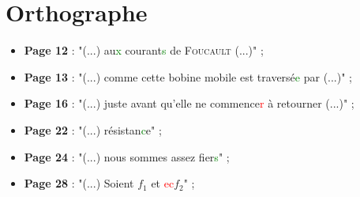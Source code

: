 \documentclass{article}
\begin{document}
\section{Orthographe}
\begin{itemize}
	\item \textbf{Page 12} : "(...) au\textcolor{green}{x} courant\textcolor{green}{s} de \textsc{Foucault} (...)" ;
	\item \textbf{Page 13} : "(...) comme cette bobine mobile est traversé\textcolor{green}{e} par (...)" ;
	\item \textbf{Page 16} : "(...) juste avant qu'elle ne commence\textcolor{red}{r} à retourner (...)" ;
	\item \textbf{Page 22} : "(...) résistan\textcolor{green}{c}e" ;
	\item \textbf{Page 24} : "(...) nous sommes assez fier\textcolor{green}{s}" ;
	\item \textbf{Page 28} : "(...) Soient $f_1$ et \textcolor{red}{ec}$f_2$" ;
\end{itemize}
\end{document}
